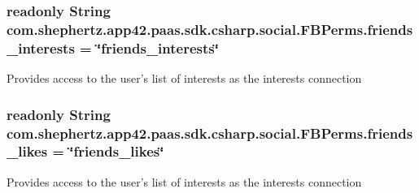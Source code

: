 \hypertarget{classcom_1_1shephertz_1_1app42_1_1paas_1_1sdk_1_1csharp_1_1social_1_1_f_b_perms_a58e417216e8b8c090e86abdd595e37ad}{
\subsubsection[{friends\+\_\+interests}]{\setlength{\rightskip}{0pt plus 5cm}readonly String com.\+shephertz.\+app42.\+paas.\+sdk.\+csharp.\+social.\+F\+B\+Perms.\+friends\+\_\+interests = \char`\"{}friends\+\_\+interests\char`\"{}\hspace{0.3cm}{\ttfamily [static]}}}\label{classcom_1_1shephertz_1_1app42_1_1paas_1_1sdk_1_1csharp_1_1social_1_1_f_b_perms_a58e417216e8b8c090e86abdd595e37ad}


Provides access to the user's list of interests as the interests connection 

\hypertarget{classcom_1_1shephertz_1_1app42_1_1paas_1_1sdk_1_1csharp_1_1social_1_1_f_b_perms_ad6603b10e68705632c605f811d0b9aa1}{
\subsubsection[{friends\+\_\+likes}]{\setlength{\rightskip}{0pt plus 5cm}readonly String com.\+shephertz.\+app42.\+paas.\+sdk.\+csharp.\+social.\+F\+B\+Perms.\+friends\+\_\+likes = \char`\"{}friends\+\_\+likes\char`\"{}\hspace{0.3cm}{\ttfamily [static]}}}\label{classcom_1_1shephertz_1_1app42_1_1paas_1_1sdk_1_1csharp_1_1social_1_1_f_b_perms_ad6603b10e68705632c605f811d0b9aa1}


Provides access to the user's list of interests as the interests connection 

